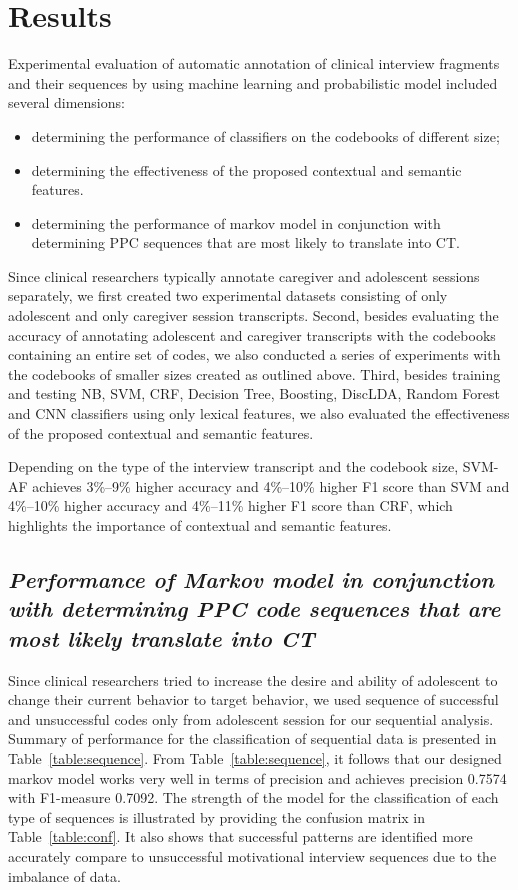 \documentclass{amia}
\begin{document}
\section*{Results}
Experimental evaluation of automatic annotation of clinical interview fragments and their sequences by using machine learning and probabilistic model included several dimensions:
\begin{itemize}
\item determining the performance of classifiers on the codebooks of different size;
\item determining the effectiveness of the proposed contextual and semantic features.
\item determining the performance of markov model in conjunction with determining PPC sequences that are most likely to translate into CT.
\end{itemize}

Since clinical researchers typically annotate caregiver and adolescent sessions separately, we first created two experimental datasets consisting of only adolescent and only caregiver session transcripts. Second, besides evaluating the accuracy of annotating adolescent and caregiver transcripts with the codebooks containing an entire set of codes, we also conducted a series of experiments with the codebooks of smaller sizes created as outlined above. Third, besides training and testing NB, SVM, CRF, Decision Tree, Boosting, DiscLDA, Random Forest and CNN classifiers using only lexical features, we also evaluated the effectiveness of the proposed contextual and semantic features.

Depending on the type of the interview transcript and the codebook size, SVM-AF achieves 3\%--9\% higher accuracy and 4\%--10\% higher F1 score than SVM and 4\%--10\% higher accuracy and 4\%--11\% higher F1 score than CRF, which highlights the importance of contextual and semantic features.

\subsection*{\textit{Performance of Markov model in conjunction with determining PPC code sequences that are most likely translate into CT}}
Since clinical researchers tried to increase the desire and ability of adolescent to change their current behavior to target behavior, we used sequence of successful and unsuccessful codes only from adolescent session for our sequential analysis. Summary of performance for the classification of sequential data is presented in Table~\ref{table:sequence}. 
From Table~\ref{table:sequence}, it follows that our designed markov model works very well in terms of precision and achieves precision 0.7574 with F1-measure 0.7092. The strength of the model for the classification of each type of sequences is illustrated by providing the confusion matrix in Table~\ref{table:conf}. It also shows that successful patterns are identified more accurately compare to unsuccessful motivational interview sequences due to the imbalance of data.\\
\end{document}
